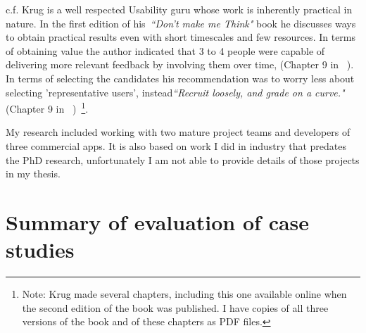 c.f. Krug is a well respected Usability guru whose work is inherently practical in nature. In the first edition of his~\emph{``Don't make me Think"} book he discusses ways to obtain practical results even with short timescales and few resources. In terms of obtaining value the author indicated that 3 to 4 people were capable of delivering more relevant feedback by involving them over time, (Chapter 9 in ~\cite{krug2000dont_make_me_think}). In terms of selecting the candidates his recommendation was to worry less about selecting 'representative users', instead\emph{``Recruit loosely, and grade on a curve."} (Chapter 9 in ~\cite{krug2000dont_make_me_think})~\footnote{Note: Krug made several chapters, including this one available online when the second edition of the book was published. I have copies of all three versions of the book and of these chapters as PDF files.}.


My research included working with two mature project teams and developers of three commercial apps. It is also based on work I did in industry that predates the PhD research, unfortunately I am not able to provide details of those projects in my thesis. 

\section{Summary of evaluation of case studies}


